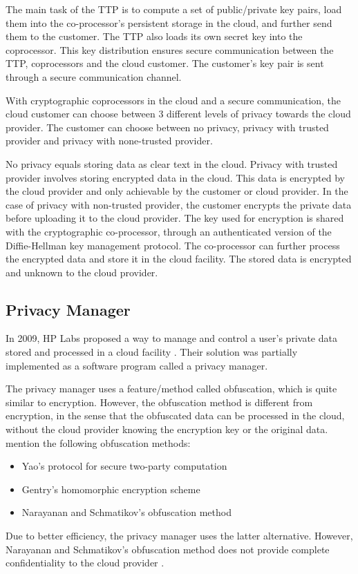 \documentclass[pdftex,english,10pt,b5paper,twoside]{book}
\begin{document}
The main task of the TTP is to compute a set of public/private key pairs, load
them into the co-processor's persistent storage in the cloud, and
further send them to the customer. The TTP also loads its own secret key into
the coprocessor. This key distribution ensures secure communication between the
TTP, coprocessors and the cloud customer. The customer's key pair is sent through a
secure communication channel.

With cryptographic coprocessors in the cloud and a secure communication, the
cloud customer can choose between 3 different levels of privacy towards the
cloud provider. The customer can choose between no privacy, privacy with trusted
provider and privacy with none-trusted provider.

No privacy equals storing data as clear text in the cloud. Privacy with trusted
provider involves storing encrypted data in the cloud. This data is encrypted by
the cloud provider and only achievable by the customer or cloud provider.
In the case of privacy with non-trusted provider, the customer encrypts the
private data before uploading it to the cloud provider. The key used for
encryption is shared with the cryptographic co-processor, through an
authenticated version of the Diffie-Hellman key management protocol. The
co-processor can further process the encrypted data and store it in the cloud
facility. The stored data is encrypted and unknown to the cloud provider.

\subsection{Privacy Manager}
In 2009, HP Labs proposed a way to manage and control a user's private data stored and
processed in a cloud facility \cite{privacymanager}. Their solution was partially implemented
as a software program called a privacy manager.

The privacy manager uses a feature/method called obfuscation, which is quite similar to
encryption. However, the obfuscation method is different from encryption, in the
sense that the obfuscated data can be processed in the cloud, without the cloud
provider knowing the encryption key or the original data. \cite{privacymanager} mention the following
obfuscation methods:
\begin{itemize}
\item Yao's protocol for secure two-party computation \cite{yao}
\item Gentry's homomorphic encryption scheme \cite{gentry}
\item Narayanan and Schmatikov's obfuscation method \cite{obfuscationmethod}
\end{itemize}
Due to better efficiency, the privacy manager uses the latter alternative. However,
Narayanan and Schmatikov's obfuscation method does not provide complete
confidentiality to the cloud provider \cite{obfuscationmethod}.
\end{document}
